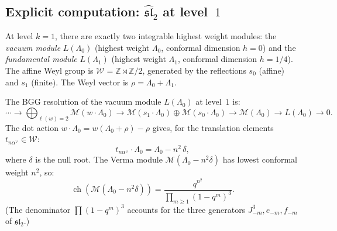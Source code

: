 \subsection{\texorpdfstring{Explicit computation: $\widehat{\mathfrak{sl}}_2$ at level~$1$}{Explicit computation: affine sl2 at level 1}}
\label{sec:sl2-level1-computation}

\begin{example}
\label{ex:sl2-level1}
At level $k=1$, there are exactly two integrable highest weight modules: the \emph{vacuum module} $L(\Lambda_0)$ (highest weight $\Lambda_0$, conformal dimension $h=0$) and the \emph{fundamental module} $L(\Lambda_1)$ (highest weight $\Lambda_1$, conformal dimension $h = 1/4$).
The affine Weyl group is $\mathcal{W} = \mathbb{Z} \rtimes \mathbb{Z}/2$,
generated by the reflections $s_0$ (affine) and $s_1$ (finite).
The Weyl vector is $\rho = \Lambda_0 + \Lambda_1$.
\end{example}

\begin{proposition}
\label{prop:bgg-sl2-level1}
The BGG resolution of the vacuum module $L(\Lambda_0)$ at level~$1$ is:
\begin{equation}\label{eq:bgg-sl2-level1}
\cdots \to \bigoplus_{\ell(w)=2} \mathcal{M}(w \cdot \Lambda_0)
\to \mathcal{M}(s_1 \cdot \Lambda_0) \oplus \mathcal{M}(s_0 \cdot \Lambda_0)
\to \mathcal{M}(\Lambda_0) \to L(\Lambda_0) \to 0.
\end{equation}
The dot action $w \cdot \Lambda_0 = w(\Lambda_0 + \rho) - \rho$ gives,
for the translation elements $t_{n\alpha^\vee} \in \mathcal{W}$:
\begin{equation}\label{eq:dot-action-translations}
t_{n\alpha^\vee} \cdot \Lambda_0 = \Lambda_0 - n^2\,\delta,
\end{equation}
where $\delta$ is the null root.
The Verma module $\mathcal{M}(\Lambda_0 - n^2\delta)$ has lowest
conformal weight $n^2$, so:
\begin{equation}\label{eq:verma-character-sl2}
\operatorname{ch}(\mathcal{M}(\Lambda_0 - n^2\delta))
= \frac{q^{n^2}}{\prod_{m \geq 1}(1-q^m)^3}.
\end{equation}
(The denominator $\prod(1-q^m)^3$ accounts for the three
generators $J^3_{-m}, e_{-m}, f_{-m}$ of
$\widehat{\mathfrak{sl}}_2$.)
\end{proposition}

